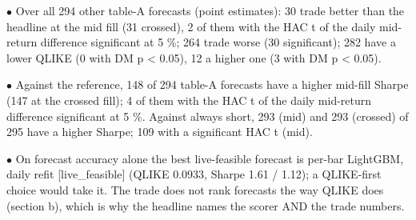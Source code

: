 \documentclass[10pt]{article}
\begin{document}
\endgroup
$\bullet$ Over all 294 other table-A forecasts (point estimates): 30 trade better than the headline at the mid fill (31 crossed), 2 of them with the HAC t of the daily mid-return difference significant at 5 \%; 264 trade worse (30 significant); 282 have a lower QLIKE (0 with DM p < 0.05), 12 a higher one (3 with DM p < 0.05).\par
$\bullet$ Against the reference, 148 of 294 table-A forecasts have a higher mid-fill Sharpe (147 at the crossed fill); 4 of them with the HAC t of the daily mid-return difference significant at 5 \%. Against always short, 293 (mid) and 293 (crossed) of 295 have a higher Sharpe; 109 with a significant HAC t (mid).\par
$\bullet$ On forecast accuracy alone the best live-feasible forecast is per-bar LightGBM, daily refit [live\_feasible] (QLIKE 0.0933, Sharpe 1.61 /\allowbreak{} 1.12); a QLIKE-first choice would take it. The trade does not rank forecasts the way QLIKE does (section b), which is why the headline names the scorer AND the trade numbers.\par
\end{document}
